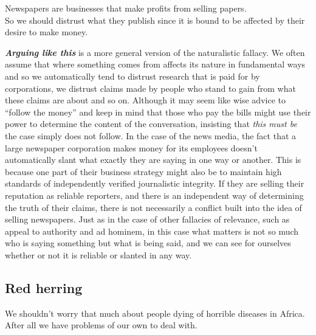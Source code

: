 \documentclass[
  12pt, openany]{book}
\theoremstyle{definition}
\theoremstyle{definition}
\theoremstyle{definition}
\theoremstyle{definition}
\theoremstyle{remark}
\begin{document}
\begin{center}

\begin{argument}
Newspapers are businesses that make profits from selling papers.\\

So we should distrust what they publish since it is bound to be affected by their desire to make money.

\end{argument}


\end{center}

\textbf{\emph{Arguing like this}} is a more general version of the naturalistic fallacy. We often assume that where something comes from affects its nature in fundamental ways and so we automatically tend to distrust research that is paid for by corporations, we distrust claims made by people who stand to gain from what these claims are about and so on. Although it may seem like wise advice to ``follow the money'' and keep in mind that those who pay the bills might use their power to determine the content of the conversation, insisting that \emph{this must be} the case simply does not follow. In the case of the news media, the fact that a large newspaper corporation makes money for its employees doesn't automatically slant what exactly they are saying in one way or another. This is because one part of their business strategy might also be to maintain high standards of independently verified journalistic integrity. If they are selling their reputation as reliable reporters, and there is an independent way of determining the truth of their claims, there is not necessarily a conflict built into the idea of selling newspapers. Just as in the case of other fallacies of relevance, such as appeal to authority and ad hominem, in this case what matters is not so much who is saying something but what is being said, and we can see for ourselves whether or not it is reliable or slanted in any way.

\hypertarget{red-herring}{%
\subsection*{Red herring}\label{red-herring}}


\begin{center}

\begin{argument}
We shouldn't worry that much about people dying of horrible diseases in Africa.\\

After all we have problems of our own to deal with.

\end{argument}


\end{center}
\end{document}

